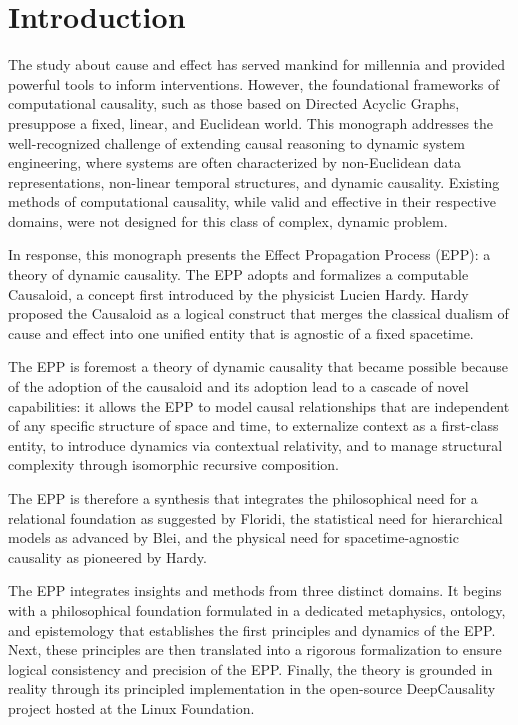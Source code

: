 \section{Introduction}
\label{sec:introduction}

The study about cause and effect has served mankind for millennia and provided powerful tools to inform interventions.
However, the foundational frameworks of computational causality, such as those based on Directed Acyclic Graphs, 
presuppose a fixed, linear, and Euclidean world. This monograph addresses the well-recognized challenge 
of extending causal reasoning to dynamic system engineering, where systems are often characterized 
by non-Euclidean data representations, non-linear temporal structures, and dynamic causality. 
Existing methods of computational causality, while valid and effective in their respective domains, 
were not designed for this class of complex, dynamic problem.

In response, this monograph presents the Effect Propagation Process (EPP): a theory of dynamic causality. 
The EPP adopts and formalizes a computable Causaloid, a concept first introduced by the physicist Lucien Hardy. 
Hardy proposed the Causaloid as a logical construct that merges the classical dualism of cause and effect 
into one unified entity that is agnostic of a fixed spacetime.

The EPP is foremost a theory of dynamic causality that became possible because of the adoption of the causaloid 
and its adoption lead to a cascade of novel capabilities: it allows the EPP to model causal relationships 
that are independent of any specific structure of space and time, to externalize context as a first-class entity, 
to introduce dynamics via contextual relativity, and to manage structural complexity through isomorphic recursive composition.

The EPP is therefore a synthesis that integrates the philosophical need for a relational foundation
as suggested by Floridi, the statistical need for hierarchical models as advanced by Blei, 
and the physical need for spacetime-agnostic causality as pioneered by Hardy. 

The EPP integrates insights and methods from three distinct domains. It begins with a philosophical foundation formulated 
in a dedicated metaphysics, ontology, and epistemology that establishes the first principles and dynamics of the EPP. 
Next, these principles are then translated into a rigorous formalization to ensure logical consistency and precision of the EPP. 
Finally, the theory is grounded in reality through its principled implementation in the open-source 
DeepCausality project hosted at the Linux Foundation.

